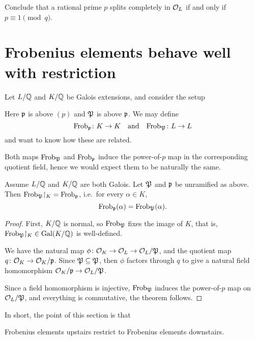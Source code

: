 \begin{ques}
	Conclude that a rational prime $p$
	splits completely in $\mathcal O_L$ if and only if $p \equiv 1 \pmod q$.
\end{ques}

\section{Frobenius elements behave well with restriction}
Let $L/\mathbb Q$ and $K/\mathbb Q$ be Galois extensions, and consider the setup
\begin{center}
\end{center}
Here $\mathfrak p$ is above $(p)$ and $\mathfrak P$ is above $\mathfrak p$.
We may define
\[ \mathrm{Frob}_\mathfrak p \colon K \to K
	\quad\text{and}\quad
	\mathrm{Frob}_{\mathfrak P} \colon L \to L \]
and want to know how these are related.

Both maps $\mathrm{Frob}_{\mathfrak P}$ and $\mathrm{Frob}_{\mathfrak p}$ induce the power-of-$p$ map in the corresponding quotient field, hence we would expect them to be naturally the same.

\begin{theorem}
	Assume $L/\mathbb Q$ and $K/\mathbb Q$ are both Galois.
	Let $\mathfrak P$ and $\mathfrak p$ be unramified as above.
	Then $\Frob_{\kP} \restrict{K} = \Frob_{\kp}$,
	i.e.\ for every $\alpha \in K$,
	\[ \mathrm{Frob}_\mathfrak p(\alpha) = \mathrm{Frob}_{\mathfrak P}(\alpha). \]
\end{theorem}
\begin{proof}
	First, $K/\mathbb Q$ is normal, so $\mathrm{Frob}_{\mathfrak P}$ fixes the image of $K$, that is,
	$\Frob_{\kP} \restrict{K} \in \Gal(K/\QQ)$ is well-defined.

	We have the natural map $\phi \colon \mathcal O_K \to \mathcal O_L \to \mathcal O_L/\mathfrak P$, and the quotient map $q\colon \mathcal O_K \to \mathcal O_K / \mathfrak p$. Since $\mathfrak P \subseteq \mathfrak P$, then $\phi$ factors through $q$ to give a natural field homomorphism $\mathcal O_K / \mathfrak p \to \mathcal O_L / \mathfrak P$.

	Since a field homomorphism is injective, $\mathrm{Frob}_{\mathfrak P}$ induces the power-of-$p$ map on $\mathcal O_L / \mathfrak P$, and everything is commutative, the theorem follows.
\end{proof}
In short, the point of this section is that
\begin{moral}
	Frobenius elements upstairs restrict to Frobenius elements downstairs.
\end{moral}


